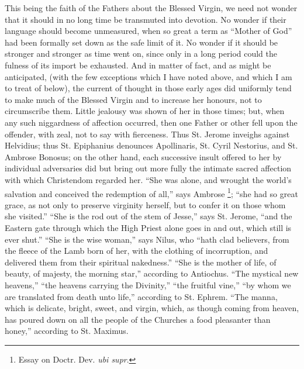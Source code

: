This being the faith of the Fathers about the Blessed Virgin, we need
not wonder that it should in no long time be transmuted into devotion.
No wonder if their language should become unmeasured, when so great a
term as ``Mother of God'' had been formally set down as the
safe limit of it. No wonder if it should be stronger and stronger as
time went on, since only in a long period could the fulness of its
import be exhausted. And in matter of fact, and as might be anticipated,
(with the few exceptions which I have noted above, and which I am to
treat of below), the current of thought in those early ages did
uniformly tend to make much of the Blessed Virgin and to increase her
honours, not to circumscribe them. Little jealousy was shown of her in
those times; but, when any such niggardness of affection occurred, then
one Father or other fell upon the offender, with zeal, not to say with
fierceness. Thus St. Jerome inveighs against Helvidius; thus St.
Epiphanius denounces Apollinaris, St. Cyril Nestorius, and St. Ambrose
Bonosus; on the other hand, each successive insult offered to her by
individual adversaries did but bring out more fully the intimate sacred
affection with which Christendom regarded her. ``She was alone, and
wrought the world's salvation and conceived the redemption of all,''
says Ambrose \footnote{Essay on Doctr.
Dev. \emph{ubi supr}.}; ``she had
so great grace, as not only to preserve virginity herself, but to confer
it on those whom she visited.'' ``She is the rod out of the stem
of Jesse,'' says St. Jerome, ``and the Eastern gate through
which the High Priest alone goes in and out, which still is ever
shut.'' ``She is the wise woman,'' says Nilus, who
``hath clad believers, from the fleece of the Lamb born of her, with
the clothing of incorruption, and delivered them from their spiritual
nakedness.'' ``She is the mother of life, of beauty, of
majesty, the morning star,'' according to Antiochus. ``The
mystical new heavens,'' ``the heavens carrying the
Divinity,'' ``the fruitful vine,'' ``by whom we are
translated from death unto life,'' according to St. Ephrem.
``The manna, which is delicate, bright, sweet, and virgin, which, as
though coming from heaven, has poured down on all the people of the
Churches a food pleasanter than honey,'' according to St. Maximus.

